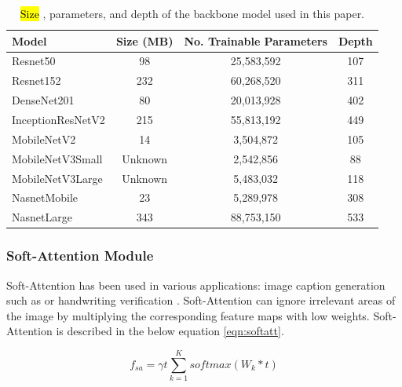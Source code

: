\documentclass[sensors,article,accept,pdftex,moreauthors]{Definitions/mdpi}
\begin{document}
	\begin{table}[H]
		\caption{\hl{Size} %
 , parameters, and depth of the backbone model used in this paper.}
		\label{table:model-summary}
		\setlength{\tabcolsep}{5.2mm}\begin{tabular}{l  c c c} 
\toprule
\textbf{Model} & \textbf{Size (MB)} & \textbf{No. Trainable Parameters} & \textbf{Depth} \\ 
\midrule
Resnet50 & 98 & 25,583,592 & 107 \\ 
\midrule
Resnet152 & 232 & 60,268,520 & 311 \\ 
\midrule
DenseNet201 & 80 & 20,013,928 & 402 \\
\midrule
InceptionResNetV2 & 215 & 55,813,192 & 449 \\
\midrule
MobileNetV2 & 14 & 3,504,872 & 105 \\ 
\midrule
MobileNetV3Small & Unknown & 2,542,856 & 88 \\ 
\midrule
MobileNetV3Large & Unknown & 5,483,032 & 118 \\
\midrule
NasnetMobile & 23 & 5,289,978 & 308 \\
\midrule
NasnetLarge & 343 & 88,753,150 & 533 \\ 
\bottomrule
		\end{tabular}
	\end{table}
	
	\subsubsection{Soft-Attention Module}
	Soft-Attention has been used in various applications: image caption generation such as \cite{03044} or handwriting verification \cite{202017}. Soft-Attention can ignore irrelevant areas of the image by multiplying the corresponding feature maps with low weights. Soft-Attention is described in the below equation \eqref{eqn:softatt}.
	
	\begin{equation}
		\label{eqn:softatt}
		f_{sa} = \gamma t\sum_{k=1}^{K}softmax(W_k * t)
	\end{equation}
	
\end{document}
